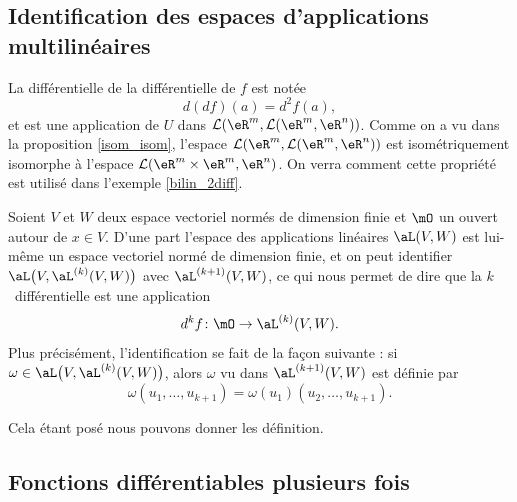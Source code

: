 \subsection{Identification des espaces d'applications multilinéaires}

La différentielle de la différentielle de $f$ est notée 
\[
d(df)(a)=d^2f(a),
\]
et est une application de $U$ dans $\mathcal{L}(\eR^m,\mathcal{L}(\eR^m, \eR^n) )$. Comme on a vu dans la proposition \ref{isom_isom}, l'espace $\mathcal{L}(\eR^m,\mathcal{L}(\eR^m, \eR^n) )$ est isométriquement isomorphe à l'espace $\mathcal{L}(\eR^m\times\eR^m, \eR^n )$. On verra comment cette propriété  est utilisé dans l'exemple \ref{bilin_2diff}.


Soient \( V\) et \( W\) deux espace vectoriel normés de dimension finie et \( \mO\) un ouvert autour de \( x\in V\). D'une part l'espace des applications linéaires \( \aL(V,W)\) est lui-même un espace vectoriel normé de dimension finie, et on peut identifier \(  \aL\big( V,\aL^{(k)}(V,W) \big)\) avec \( \aL^{(k+1)}(V,W)\), ce qui nous permet de dire que la \( k\)\ieme\ différentielle est une application
\begin{equation}
    d^kf\colon \mO\to \aL^{(k)}(V,W).
\end{equation}
Plus précisément, l'identification se fait de la façon suivante : si \( \omega\in \aL\big( V,\aL^{(k)}(V,W) \big)\), alors \( \omega\) vu dans \( \aL^{(k+1)}(V,W)\) est définie par
\begin{equation}
    \omega(u_1,\ldots, u_{k+1})=\omega(u_1)(u_2,\ldots, u_{k+1}).    
\end{equation}

Cela étant posé nous pouvons donner les définition.

\subsection{Fonctions différentiables plusieurs fois}

